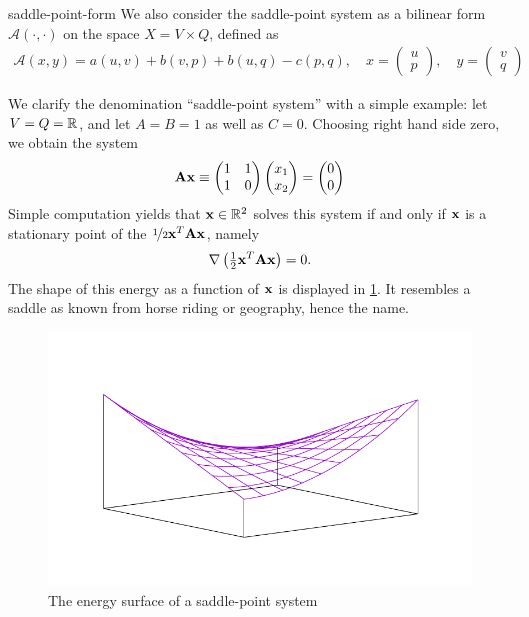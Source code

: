 \begin{Notation}{saddle-point-form}
  We also consider the saddle-point system as a bilinear form $\mathcal A(\cdot,\cdot)$ on the space $X = V\times Q$, defined as
  \begin{gather}
    \mathcal A(x,y)
    = a(u,v) + b(v,p) + b(u,q) - c(p,q),
    \quad x =
    \begin{pmatrix}
      u\\p
    \end{pmatrix}
    ,\quad y=
    \begin{pmatrix}
      v\\q
    \end{pmatrix}
  \end{gather}
\end{Notation}

\begin{example}
  We clarify the denomination ``saddle-point system'' with a simple
  example: let $V = Q = \mathbb R$, and let $A=B=1$ as well as
  $C=0$. Choosing right hand side zero, we obtain the system
  \begin{gather}
    \mathbf A \mathbf x \equiv
    \begin{pmatrix}
      1 & 1 \\1 & 0
    \end{pmatrix}
    \begin{pmatrix}
      x_1 \\ x_2
    \end{pmatrix}
    =
    \begin{pmatrix}
     0\\0
    \end{pmatrix}
  \end{gather}
  Simple computation yields that $\mathbf x\in \mathbb R^2$ solves this system if
  and only if $\mathbf x$ is a stationary point of the 
  $\nicefrac12\mathbf x^T\mathbf A\mathbf x$, namely
  \begin{gather}
    \nabla \left(\tfrac12\mathbf x^T\mathbf A\mathbf x\right) = 0.
  \end{gather}
  The shape of this energy as a function of $\mathbf x$ is displayed in
  \cref{fig:saddle}. It resembles a saddle as known from horse riding
  or geography, hence the name.
\end{example}
\begin{figure}[tp]
  \centering
  \includegraphics[width=.8\textwidth]{mixed/graph/saddle}
  \caption{The energy surface of a saddle-point system}
  \label{fig:saddle}
\end{figure}

